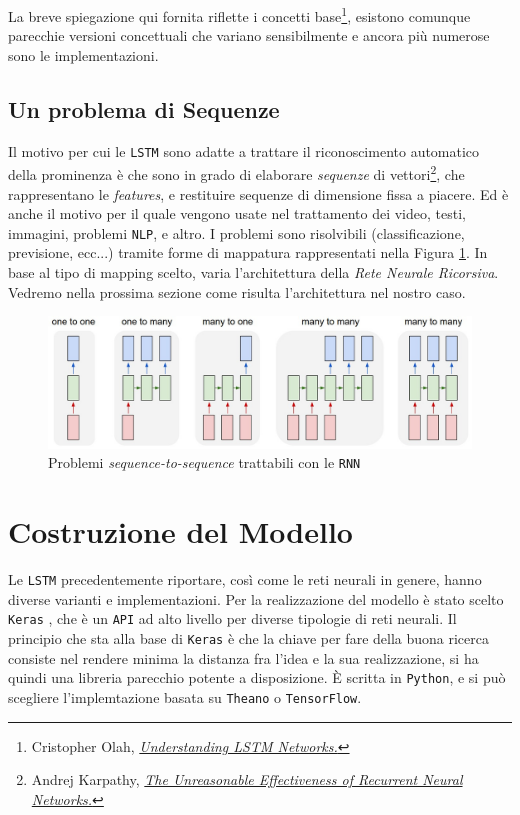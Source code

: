 \documentclass[twoside,twocolumn,10pt]{extarticle}
\theoremstyle{definition}
\begin{document}
		La breve spiegazione qui fornita riflette i concetti base\footnote{Cristopher Olah, \emph{\href{http://colah.github.io/posts/2015-08-Understanding-LSTMs/}{Understanding LSTM Networks.}}}, esistono comunque parecchie versioni concettuali che variano sensibilmente e ancora più numerose sono le implementazioni.
		
	\subsection{Un problema di Sequenze}
		Il motivo per cui le \texttt{LSTM} sono adatte a trattare il riconoscimento automatico della prominenza è che sono in grado di elaborare \textit{sequenze} di vettori\footnote{Andrej Karpathy, \emph{\href{http://karpathy.github.io/2015/05/21/rnn-effectiveness/}{The Unreasonable Effectiveness of Recurrent Neural Networks.}}}, che rappresentano le \textit{features}, e restituire sequenze di dimensione fissa a piacere. Ed è anche il motivo per il quale vengono usate nel trattamento dei video, testi, immagini, problemi \texttt{NLP}, e altro. I problemi sono risolvibili (classificazione, previsione, ecc...) tramite forme di mappatura rappresentati nella Figura \ref{fig:seqs}.	In base al tipo di mapping scelto, varia l'architettura della \textit{Rete Neurale Ricorsiva}. Vedremo nella prossima sezione come risulta l'architettura nel nostro caso.
		
		\begin{figure}[h]
			\centering
			\includegraphics[scale=.3]{img/seqs.jpeg}
			\caption{Problemi \textit{sequence-to-sequence} trattabili con le \texttt{RNN}}
			\label{fig:seqs}
		\end{figure}

\section{Costruzione del Modello}\label{sec:building}
	Le \texttt{LSTM} precedentemente riportare, così come le reti neurali in genere, hanno diverse varianti e implementazioni. Per la realizzazione del modello è stato scelto \texttt{Keras} \cite{bib:chollet2015keras}, che è un \texttt{API} ad alto livello per diverse tipologie di reti neurali. Il principio che sta alla base di \texttt{Keras} è che la chiave per fare della buona ricerca consiste nel rendere minima la distanza fra l'idea e la sua realizzazione, si ha quindi una libreria parecchio potente a disposizione. È scritta in \texttt{Python}, e si può scegliere l'implemtazione basata su \texttt{Theano} o \texttt{TensorFlow}.
	
\end{document}
